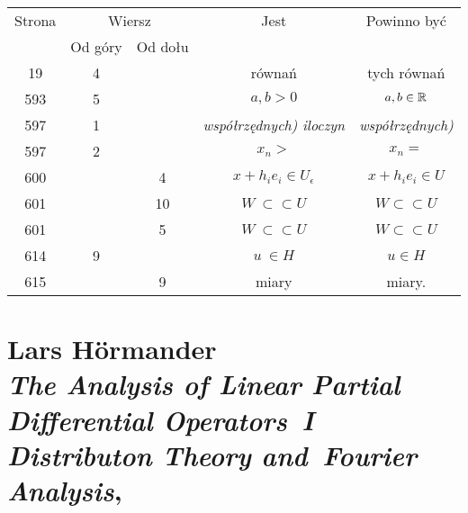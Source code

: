 \documentclass[a4paper,11pt]{article}
\numberwithin{equation}{section}
\begin{document}
\begin{center}

  \begin{tabular}{|c|c|c|c|c|}
    \hline
    Strona & \multicolumn{2}{c|}{Wiersz} & Jest
                              & Powinno być \\ \cline{2-3}
    & Od góry & Od dołu & & \\
    \hline
    19  &  4 & & równań & tych równań \\
    593 &  5 & & $a, b > 0$ & $a, b \in \mathbb{R}$ \\
    597 &  1 & & \textit{współrzędnych) iloczyn}
           & \textit{współrzędnych)} \\
    597 &  2 & & $x_{ n } >$ & $x_{ n } =$ \\
    600 & & 4 & $x + h_{ i } e_{ i } \in U_{ \epsilon }$
           & $x + h_{ i } e_{ i } \in U$ \\
    601 & & 10 & $W \: \subset \subset U$ & $W \subset \subset U$ \\
    601 & &  5 & $W \: \subset \subset U$ & $W \subset \subset U$ \\
    614 &  9 & & $u \: \in H$ & $u \in H$\\
    615 & &  9 & miary & miary. \\
    \hline
  \end{tabular}

\end{center}

\VerSpaceTwo



















\newpage

\section{ %
  Lars H\"{o}rmander \\
  \textit{The Analysis of Linear Partial Differential Operators~I} \\
  \textit{Distributon Theory and~Fourier Analysis},
  \cite{HormanderAnalysisPartialDifferentialOperators1983}}
\end{document}
